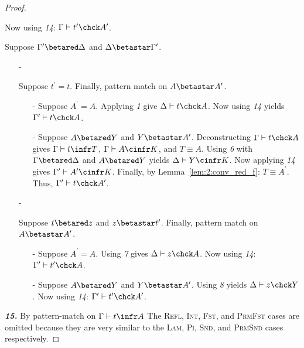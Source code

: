 \begin{proof}
\begin{enumerate}
{\begin{enumerate}
{                    Now using \textit{14}: $\Gamma \vdash t^\prime \chck A^\prime$.
                }
            \end{enumerate}
        }
    \end{enumerate}
    Suppose $\Gamma^\prime \betared \Delta$ and $\Delta \betastar \Gamma^\prime$.
    \begin{enumerate}
        \item[-] {
            Suppose $t^\prime = t$.
            Finally, pattern match on $A \betastar A^\prime$.
            \begin{enumerate}
                \item[-] {
                    Suppose $A^\prime = A$.
                    Applying \textit{1} give $\Delta \vdash t \chck A$.
                    Now using \textit{14} yields $\Gamma^\prime \vdash t \chck A$.
                }
                \item[-] {
                    Suppose $A \betared Y$ and $Y \betastar A^\prime$.
                    Deconstructing $\Gamma \vdash t \chck A$ gives $\Gamma \vdash t \infr T$, $\Gamma \vdash A \cinfr K$, and $T \equiv A$.
                    Using \textit{6} with $\Gamma \betared \Delta$ and $A \betared Y$ yields $\Delta \vdash Y \cinfr K$.
                    Now applying \textit{14} gives $\Gamma^\prime \vdash A^\prime \cinfr K$.
                    Finally, by Lemma~\ref{lem:2:conv_red_f}: $T \equiv A^\prime$.
                    Thus, $\Gamma^\prime \vdash t \chck A^\prime$.
                }
            \end{enumerate}
        }
        \item[-] {
            Suppose $t \betared z$ and $z \betastar t^\prime$.
            Finally, pattern match on $A \betastar A^\prime$.
            \begin{enumerate}
                \item[-] {
                    Suppose $A^\prime = A$.
                    Using \textit{7} gives $\Delta \vdash z \chck A$.
                    Now using \textit{14}: $\Gamma^\prime \vdash t^\prime \chck A$.
                }
                \item[-] {
                    Suppose $A \betared Y$ and $Y \betastar A^\prime$.
                    Using \textit{8} yields $\Delta \vdash z \chck Y$.
                    Now using \textit{14}: $\Gamma^\prime \vdash t^\prime \chck A^\prime$.
                }
            \end{enumerate}
        }
    \end{enumerate}
    \noindent \textbf{\textit{15.}} By pattern-match on $\Gamma \vdash t \infr A$
    The \textsc{Refl}, \textsc{Int}, \textsc{Fst}, and \textsc{PrmFst} cases are omitted because they are very similar to the \textsc{Lam}, \textsc{Pi}, \textsc{Snd}, and \textsc{PrmSnd} cases respectively.


\end{proof}
